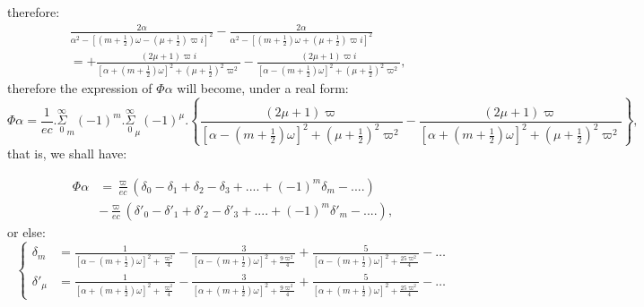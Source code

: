 \documentclass{article}
\begin{document}
therefore:
\[ \begin{aligned}&\frac{2\alpha}{\alpha^{2}-[(m+\tfrac{1}{2})\omega-(\mu+\tfrac{1}{2})\varpi i]^{2}}-\frac{2\alpha}{\alpha^{2}-[(m+\tfrac{1}{2})\omega+(\mu+\tfrac{1}{2})\varpi i]^{2}}\\ &=+\frac{(2\mu+1)\varpi i}{[\alpha+(m+\tfrac{1}{2})\omega]^{2}+(\mu+\tfrac{1}{2})^{2}\varpi^{2}}-\frac{(2\mu+1)\varpi i}{[\alpha-(m+\tfrac{1}{2})\omega]^{2}+(\mu+\tfrac{1}{2})^{2}\varpi^{2}},\end{aligned} \]
therefore the expression of $\Phi\alpha$ will become, under a real form:
\[ \Phi\alpha=\frac{1}{ec}.\overset{\infty}{\underset{0}{\Sigma}}_{m}(-1)^{m}.\overset{\infty}{\underset{0}{\Sigma}}_{\mu}(-1)^{\mu}.\left\{\frac{(2\mu+1)\varpi}{[\alpha-(m+\tfrac{1}{2})\omega]^{2}+(\mu+\tfrac{1}{2})^{2}\varpi^{2}}-\frac{(2\mu+1)\varpi}{[\alpha+(m+\tfrac{1}{2})\omega]^{2}+(\mu+\tfrac{1}{2})^{2}\varpi^{2}}\right\}, \tag{153.} \]
that is, we shall have:

\[ \begin{aligned}\Phi\alpha&=\frac{\varpi}{ec}(\delta_{0}-\delta_{1}+\delta_{2}-\delta_{3}+....+(-1)^{m}\delta_{m}-....)\\ &-\frac{\varpi}{ec}(\delta'_{0}-\delta'_{1}+\delta'_{2}-\delta'_{3}+....+(-1)^{m}\delta'_{m}-....),\end{aligned} \tag{154.} \]
or else:
\[ \left\{\begin{aligned}\delta_{m}&=\frac{1}{[\alpha-(m+\tfrac{1}{2})\omega]^{2}+\frac{\varpi^{2}}{4}}-\frac{3}{[\alpha-(m+\tfrac{1}{2})\omega]^{2}+\frac{9\varpi^{2}}{4}}+\frac{5}{[\alpha-(m+\tfrac{1}{2})\omega]^{2}+\frac{25\varpi^{2}}{4}}-\ldots\\ \delta'_{\mu}&=\frac{1}{[\alpha+(m+\tfrac{1}{2})\omega]^{2}+\frac{\varpi^{2}}{4}}-\frac{3}{[\alpha+(m+\tfrac{1}{2})\omega]^{2}+\frac{9\varpi^{2}}{4}}+\frac{5}{[\alpha+(m+\tfrac{1}{2})\omega]^{2}+\frac{25\varpi^{2}}{4}}-\ldots\end{aligned}\right. \tag{155.} \]
\end{document}

